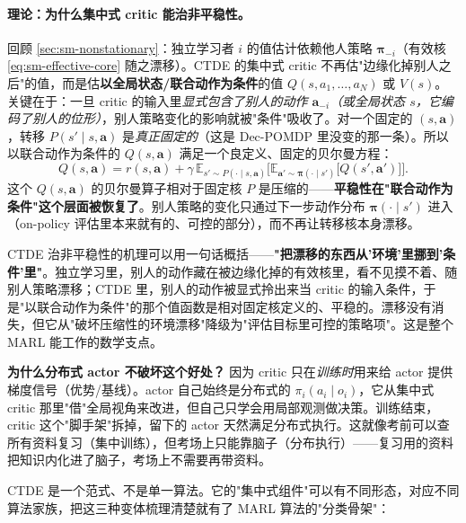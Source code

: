 \paragraph{理论：为什么集中式 critic 能治非平稳性。}
回顾 \cref{sec:sm-nonstationary}：独立学习者 $i$ 的值估计依赖他人策略 $\boldsymbol{\pi}_{-i}$（有效核 \cref{eq:sm-effective-core} 随之漂移）。CTDE 的集中式 critic 不再估"边缘化掉别人之后"的值，而是估\textbf{以全局状态/联合动作为条件}的值 $Q(s,a_1,\dots,a_N)$ 或 $V(s)$。关键在于：一旦 critic 的输入里\emph{显式包含了别人的动作 $\mathbf{a}_{-i}$（或全局状态 $s$，它编码了别人的位形）}，别人策略变化的影响就被"条件"吸收了。对一个固定的 $(s,\mathbf{a})$，转移 $P(s'\mid s,\mathbf{a})$ 是\emph{真正固定的}（这是 Dec-POMDP 里没变的那一条）。所以以联合动作为条件的 $Q(s,\mathbf{a})$ 满足一个良定义、固定的贝尔曼方程：
\begin{equation}
  Q(s,\mathbf{a})=r(s,\mathbf{a})+\gamma\,\mathbb{E}_{s'\sim P(\cdot\mid s,\mathbf{a})}\Big[\mathbb{E}_{\mathbf{a}'\sim\boldsymbol{\pi}(\cdot\mid s')}\big[Q(s',\mathbf{a}')\big]\Big].
  \label{eq:sm-central-bellman}
\end{equation}
这个 $Q(s,\mathbf{a})$ 的贝尔曼算子相对于固定核 $P$ 是压缩的——\textbf{平稳性在"联合动作为条件"这个层面被恢复了}。别人策略的变化只通过下一步动作分布 $\boldsymbol{\pi}(\cdot\mid s')$ 进入（on-policy 评估里本来就有的、可控的部分），而不再让转移核本身漂移。

\begin{insight}
CTDE 治非平稳性的机理可以用一句话概括——\textbf{"把漂移的东西从'环境'里挪到'条件'里"}。独立学习里，别人的动作藏在被边缘化掉的有效核里，看不见摸不着、随别人策略漂移；CTDE 里，别人的动作被显式拎出来当 critic 的输入条件，于是"以联合动作为条件"的那个值函数是相对固定核定义的、平稳的。漂移没有消失，但它从"破坏压缩性的环境漂移"降级为"评估目标里可控的策略项"。这是整个 MARL 能工作的数学支点。
\end{insight}

\textbf{为什么分布式 actor 不破坏这个好处？} 因为 critic 只在\emph{训练时}用来给 actor 提供梯度信号（优势/基线）。actor 自己始终是分布式的 $\pi_i(a_i\mid o_i)$，它从集中式 critic 那里"借"全局视角来改进，但自己只学会用局部观测做决策。训练结束，critic 这个"脚手架"拆掉，留下的 actor 天然满足分布式执行。这就像考前可以查所有资料复习（集中训练），但考场上只能靠脑子（分布执行）——复习用的资料把知识内化进了脑子，考场上不需要再带资料。

CTDE 是一个范式、不是单一算法。它的"集中式组件"可以有不同形态，对应不同算法家族，把这三种变体梳理清楚就有了 MARL 算法的"分类骨架"：

